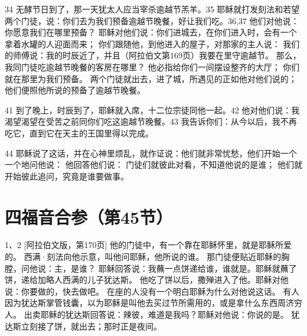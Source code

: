 34  无酵节日到了，那一天犹太人应当宰杀逾越节羔羊。35  耶稣就打发刻法和若望两个门徒，说：你们去为我们预备逾越节晚餐，好让我们吃。36,37  他们对他说：你愿意我们在哪里预备？ 耶稣对他们说：你们进城去，在你们进入时，会有一个拿着水罐的人迎面而来； 你们跟随他，到他进入的屋子，对那家的主人说： 我们的师傅说：我的时辰近了，并且（阿拉伯文第169页）我要在里守逾越节。 那么，我同门徒吃逾越节晚餐的客房在哪里？ 他必指给你们一间摆设整齐的大厅； 你们就在那里为我们预备。 两个门徒就出去，进了城，所遇见的正如他对他们说的；他们便照他所说的预备了逾越节晚餐。\par

41  到了晚上，时辰到了，耶稣就入席，十二位宗徒同他一起。42  他对他们说：我渴望渴望在受苦之前同你们吃这逾越节晚餐。43  我告诉你们：从今以后，我不再吃它，直到它在天主的王国里得以完成。\par

44  耶稣说了这话，并在心神里烦乱，就作证说：他们就非常忧愁，他们开始一个一个地问他说： 他回答他们说：   门徒们就彼此对看，不知道他说的是谁； 他们就开始彼此追问，究竟是谁要做事。\par



\section{四福音合参（第45节）}

1、2 [阿拉伯文版，第170页]  他的门徒中，有一个靠在耶稣怀里，就是耶稣所爱的。 西满·刻法向他示意，叫他问耶稣，他所说的谁。 那门徒便贴近耶稣的胸膛，问他说：主，是谁？ 耶稣回答说：我蘸一点饼递给谁，谁就是。耶稣就蘸了饼，递给加略人西满的儿子犹达斯。 他吃了饼以后，撒殚进入了他。耶稣对他说：你要做的，快去做吧。 在座的人没有一个明白耶稣为什么对他说这话。 有人因为犹达斯掌管钱囊，以为耶稣是叫他去买过节所需用的，或是拿什么东西周济穷人。 出卖耶稣的犹达斯回答说：辣彼，难道是我吗？耶稣对他说：你说的是。 犹达斯立刻接了饼，就出去；那时正是夜间。\par

